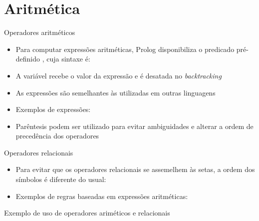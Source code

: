 \section{Aritmética}

\begin{frame}[fragile]{Operadores aritméticos}

    \begin{itemize}
        \item Para computar expressões aritméticas, Prolog disponibiliza o predicado 
            pré-definido , cuja sintaxe é:


        \item A variável  recebe o valor da expressão e é desatada no 
            \textit{backtracking}

        \item As expressões são semelhantes às utilizadas em outras linguagens

        \item Exemplos de expressões:


        \item Parêntesis podem ser utilizado para evitar ambiguidades e alterar a ordem de 
            precedência dos operadores


    \end{itemize}

\end{frame}

\begin{frame}[fragile]{Operadores relacionais}

    \begin{itemize}
        \item Para evitar que os operadores relacionais se assemelhem às setas, a ordem dos 
            símbolos é diferente do usual:


        \item Exemplos de regras baseadas em expressões aritméticas:


    \end{itemize}

\end{frame}

\begin{frame}[fragile]{Exemplo de uso de operadores ariméticos e relacionais}


\end{frame}
